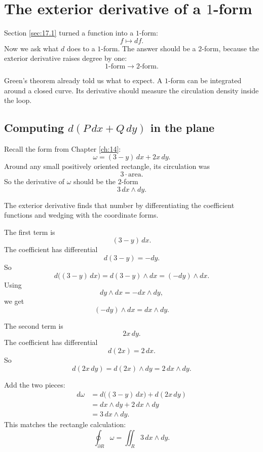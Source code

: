 \section{The exterior derivative of a \texorpdfstring{\(1\)}{1}-form}
\label{sec:17.2}

Section \ref{sec:17.1} turned a function into a \(1\)-form:
\[
    f\longmapsto df.
\]
Now we ask what \(d\) does to a \(1\)-form.  The answer should be a \(2\)-form, because
the exterior derivative raises degree by one:
\[
    1\text{-form}\longrightarrow 2\text{-form}.
\]

Green's theorem already told us what to expect.  A \(1\)-form can be integrated around
a closed curve.  Its derivative should measure the circulation density inside the loop.

\subsection{Computing \texorpdfstring{\(d(P\,dx+Q\,dy)\)}{d(P dx + Q dy)} in the plane}

Recall the form from Chapter \ref{ch:14}:
\[
    \omega=(3-y)\,dx+2x\,dy.
\]
Around any small positively oriented rectangle, its circulation was
\[
    3\cdot\text{area}.
\]
So the derivative of \(\omega\) should be the \(2\)-form
\[
    3\,dx\wedge dy.
\]

The exterior derivative finds that number by differentiating the coefficient functions
and wedging with the coordinate forms.

The first term is
\[
    (3-y)\,dx.
\]
The coefficient has differential
\[
    d(3-y)=-dy.
\]
So
\[
    d\bigl((3-y)\,dx\bigr)
    =
    d(3-y)\wedge dx
    =
    (-dy)\wedge dx.
\]
Using
\[
    dy\wedge dx=-dx\wedge dy,
\]
we get
\[
    (-dy)\wedge dx=dx\wedge dy.
\]

The second term is
\[
    2x\,dy.
\]
The coefficient has differential
\[
    d(2x)=2\,dx.
\]
So
\[
    d(2x\,dy)
    =
    d(2x)\wedge dy
    =
    2\,dx\wedge dy.
\]

Add the two pieces:
\[
\begin{aligned}
    d\omega
    &=
    d\bigl((3-y)\,dx\bigr)+d(2x\,dy)\\
    &=
    dx\wedge dy+2\,dx\wedge dy\\
    &=
    3\,dx\wedge dy.
\end{aligned}
\]
This matches the rectangle calculation:
\[
    \oint_{\partial R}\omega
    =
    \iint_R 3\,dx\wedge dy.
\]

